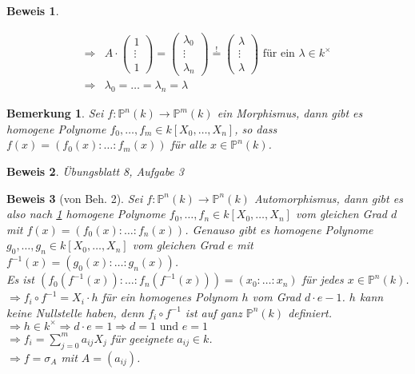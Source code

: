 \documentclass[a4paper,12pt]{report}
\theoremstyle{break}
\newtheorem{Bem}[Def]{Bemerkung}
\theoremstyle{nonumberbreak}
\theoremstyle{nonumberplain}
\newtheorem{Bew}{Beweis}
\begin{document}
\begin{Bew}
\begin{description}
\begin{align*}
\Rightarrow & A \cdot \begin{pmatrix} 1\\ \vdots \\ 1 \end{pmatrix} = \begin{pmatrix} \lambda_0 \\ \vdots \\ \lambda_n \end{pmatrix} \overset{!}{=} \begin{pmatrix} \lambda \\ \vdots \\ \lambda \end{pmatrix} \text{ für ein } \lambda \in k^\times\\
\Rightarrow &\lambda_0 = \dots = \lambda_n = \lambda
\end{align*}
\end{description}
\end{Bew}

\begin{Bem}
\label{bem:11.5}
Sei $f: \mathbb{P}^n(k) \to \mathbb{P}^m(k)$ ein Morphismus, dann gibt es homogene Polynome $f_0, \dots, f_m \in k[X_0,\dots,X_n]$, so dass $f(x) = (f_0(x):\dots:f_m(x))$ für alle $x \in \mathbb{P}^n(k)$.
\end{Bem}
\begin{Bew}
Übungsblatt 8, Aufgabe 3
\end{Bew}
\begin{Bew}[von Beh. 2]
Sei $f: \mathbb{P}^n(k) \to \mathbb{P}^n(k)$ Automorphismus, dann gibt es also nach \ref{bem:11.5} homogene Polynome $f_0,\dots,f_n \in k[X_0,\dots,X_n]$ vom gleichen Grad $d$ mit $f(x) = (f_0(x):\dots:f_n(x))$. Genauso gibt es homogene Polynome $g_0,\dots,g_n \in k[X_0,\dots,X_n]$ vom gleichen Grad $e$ mit $f^{-1}(x) = (g_0(x):\dots:g_n(x))$.\\
Es ist $(f_0(f^{-1}(x)): \dots : f_n( f^{-1}(x)) ) = (x_0: \dots : x_n)$ für jedes $x \in \mathbb{P}^n(k)$.\\
$\Rightarrow f_i \circ f^{-1} = X_i \cdot h$ für ein homogenes Polynom $h$ vom Grad $d\cdot e -1$. $h$ kann keine Nullstelle haben, denn $f_i \circ f^{-1}$ ist auf ganz $\mathbb{P}^n(k)$ definiert.\\
$\Rightarrow h \in k^\times \Rightarrow d \cdot e = 1 \Rightarrow d = 1 \text{ und } e = 1$\\
$\Rightarrow f_i = \sum_{j=0}^m a_{ij} X_j$ für geeignete $a_{ij} \in k$.\\
$\Rightarrow f = \sigma_A$ mit $A = (a_{ij})$.
\end{Bew}
 
\end{document}
